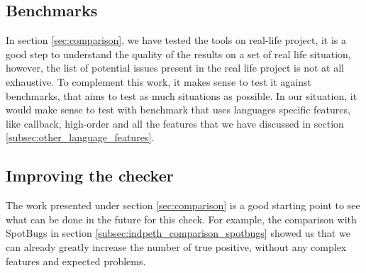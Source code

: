 \subsection{Benchmarks}
\label{subsec:benchmarks}

In section \ref{sec:comparison}, we have tested the tools on real-life project, it is a good step to understand the quality of the results on a set of real life situation, 
however, the list of potential issues present in the real life project is not at all exhaustive. To complement this work, it makes sense to test it against benchmarks, that aims to test as much situations as possible. 
In our situation, it would make sense to test with benchmark that uses languages specific features, like callback, high-order and all the features that we have discussed in section \ref{subsec:other_language_features}.

\subsection{Improving the checker}
\label{subsec:future_improving_checker}

The work presented under section \ref{sec:comparison} is a good starting point to see what can be done in the future for this check. 
For example, the comparison with SpotBugs in section \ref{subsec:indpeth_comparison_spotbugs} showed us that we can already greatly increase the number of true positive, without any complex features and expected problems.